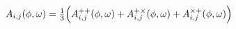 \documentclass[preview]{standalone}
\begin{document}
\begin{align*}
\special{dvisvgm:raw <g id='unique000'>}A_{i,j}(\phi,\omega) = \tfrac{1}{3}\Big(A^{++}_{i,j}(\phi,\omega) + A^{+\times}_{i,j}(\phi,\omega) + A^{\times +}_{i,j}(\phi,\omega)\Big)\special{dvisvgm:raw </g>}
\end{align*}
\end{document}
